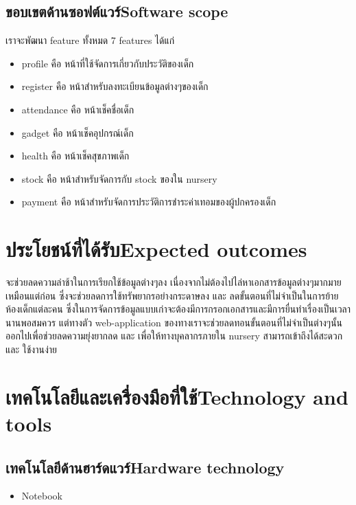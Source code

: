 \subsection{\ifcpe ขอบเขตด้านซอฟต์แวร์\else Software scope\fi}
    เราจะพัฒนา feature ทั้งหมด 7 features ได้แก่
    \begin{itemize}
        \item profile คือ หน้าที่ใช้จัดการเกี่ยวกับประวัติของเด็ก
        \item  register คือ หน้าสำหรับลงทะเบียนข้อมูลต่างๆของเด็ก
        \item attendance คือ หน้าเช็คชื่อเด็ก
        \item gadget คือ หน้าเช็คอุปกรณ์เด็ก
        \item health คือ หน้าเช็คสุขภาพเด็ก
        \item stock คือ หน้าสำหรับจัดการกับ stock ของใน nursery
        \item payment คือ หน้าสำหรับจัดการประวัติการชำระค่าเทอมของผู้ปกครองเด็ก
    \end{itemize}

\section{\ifcpe ประโยชน์ที่ได้รับ\else Expected outcomes\fi}
จะช่วยลดความล่าช้าในการเรียกใช้ข้อมูลต่างๆลง เนื่องจากไม่ต้องไปไล่หาเอกสารข้อมูลต่างๆมากมายเหมือนแต่ก่อน ซึ่งจะช่วยลดการใช้ทรัพยากรอย่างกระดาษลง และ 
ลดขั้นตอนที่ไม่จำเป็นในการย้ายห้องเด็กแต่ละคน ซึ่งในการจัดการข้อมูลแบบเก่าจะต้องมีการกรอกเอกสารและมีการยื่นทำเรื่องเป็นเวลานานพอสมควร แต่ทางตัว web-application ของทางเราจะช่วยลดทอนขั้นตอนที่ไม่จำเป็นต่างๆนั้นออกไปเพื่อช่วยลดความยุ่งยากลด และ เพื่อให้ทางบุคลากรภายใน nursery สามารถเข้าถึงได้สะดวก และ ใช้งานง่าย

\section{\ifcpe เทคโนโลยีและเครื่องมือที่ใช้\else Technology and tools\fi}

\subsection{\ifcpe เทคโนโลยีด้านฮาร์ดแวร์\else Hardware technology\fi}
\begin{itemize}
    \item Notebook
\end{itemize}

